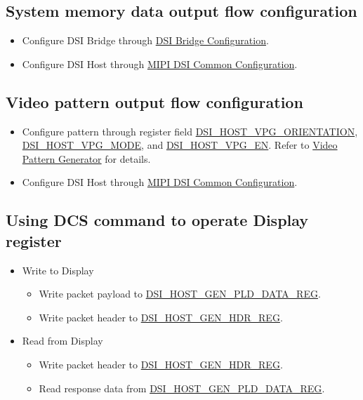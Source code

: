 \documentclass[main\_\_EN.tex]{subfiles}
\begin{document}
\subsection{System memory data output flow configuration}
\begin{itemize}
    \item Configure DSI Bridge through \hyperref[sec:dsi-bridge-configuration]{DSI Bridge Configuration}.
    \item Configure DSI Host through \hyperref[sec:mipidsi-dsi-common-programming-proc]{MIPI DSI Common Configuration}.
\end{itemize}

\subsection{Video pattern output flow configuration}
\begin{itemize}
    \item Configure pattern through register field \hyperref[fielddesc:DSIHOSTVPGORIENTATION]{DSI\_HOST\_VPG\_ORIENTATION}, \hyperref[fielddesc:DSIHOSTVPGMODE]{DSI\_HOST\_VPG\_MODE}, and \hyperref[fielddesc:DSIHOSTVPGEN]{DSI\_HOST\_VPG\_EN}. Refer to \hyperref[sec:video-pattern-generator]{Video Pattern Generator} for details.
    \item Configure DSI Host through \hyperref[sec:mipidsi-dsi-common-programming-proc]{MIPI DSI Common Configuration}.
\end{itemize}



\subsection{Using DCS command to operate Display register}
\begin{itemize}
    \item Write to Display
        \begin{itemize}
            \item Write packet payload to \hyperref[regdesc:DSIHOSTGENPLDDATAREG]{DSI\_HOST\_GEN\_PLD\_DATA\_REG}.
            \item Write packet header to \hyperref[regdesc:DSIHOSTGENHDRREG]{DSI\_HOST\_GEN\_HDR\_REG}.
        \end{itemize}
    \item Read from Display
        \begin{itemize}
            \item Write packet header to \hyperref[regdesc:DSIHOSTGENHDRREG]{DSI\_HOST\_GEN\_HDR\_REG}.
            \item Read response data from \hyperref[regdesc:DSIHOSTGENPLDDATAREG]{DSI\_HOST\_GEN\_PLD\_DATA\_REG}.
        \end{itemize}
\end{itemize}
\end{document}
